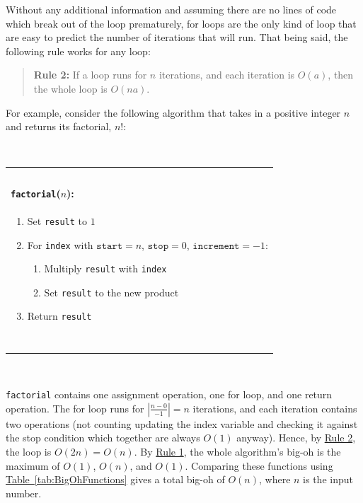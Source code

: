 \documentclass[11pt,oneside]{book}
\theoremstyle{definition}
\begin{document}
Without any additional information and assuming there are no lines of code which break out of the loop prematurely, for loops are the only kind of loop that are easy to predict the number of iterations that will run.
That being said, the following rule works for any loop:
\begin{quote}
    \textbf{Rule 2:} If a loop runs for $n$ iterations, and each iteration is $O(a)$, then the whole loop is $O(na)$. \label{quote:Rule2}
\end{quote}
For example, consider the following algorithm that takes in a positive integer $n$ and returns its factorial, $n!$:

\

\begin{tabular}{|p{\textwidth}|}
\hline
\ \\
\textbf{\huge \texttt{factorial}($n$):} \\
\begin{enumerate}[topsep=0pt]
    \item Set \texttt{result} to $1$

    \item For \texttt{index} with $\texttt{start} = n$, $\texttt{stop} = 0$, $\texttt{increment} = -1$:
    \begin{enumerate}
        \item Multiply \texttt{result} with \texttt{index}

        \item Set \texttt{result} to the new product
    \end{enumerate}

    \item Return \texttt{result}
\end{enumerate} \\
\ \\
\hline
\end{tabular}

\

\texttt{factorial} contains one assignment operation, one for loop, and one return operation.
The for loop runs for $\left| \frac{n - 0}{-1} \right| = n$ iterations, and each iteration contains two operations (not counting updating the index variable and checking it against the stop condition which together are always $O(1)$ anyway).
Hence, by \hyperref[quote:Rule2]{Rule 2}, the loop is $O(2n) = O(n)$.
By \hyperref[quote:Rule1]{Rule 1}, the whole algorithm's big-oh is the maximum of $O(1)$, $O(n)$, and $O(1)$.
Comparing these functions using \hyperref[tab:BigOhFunctions]{Table~\ref*{tab:BigOhFunctions}} gives a total big-oh of $O(n)$, where $n$ is the input number.
\end{document}
